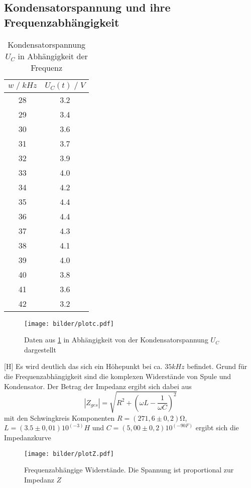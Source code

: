 \subsection{Kondensatorspannung und ihre Frequenzabhängigkeit}
\begin{table}
    \centering
    \begin{tabular}{c c}
        \toprule
        $w\;/\;kHz$ & $U_C(t)\;/\;V$\\
        \midrule
        28      &3.2\\
        29      &3.4\\
        30      &3.6\\
        31      &3.7\\
        32      &3.9\\
        33      &4.0\\
        34      &4.2\\
        35      &4.4\\
        36      &4.4\\
        37      &4.3\\
        38      &4.1\\
        39      &4.0\\
        40      &3.8\\
        41      &3.6\\
        42      &3.2\\
        \bottomrule
    \end{tabular}
    \caption{Kondensatorspannung $U_C$ in Abhängigkeit der Frequenz}
    \label{tab:tabelle_w}
\end{table}
\begin{figure}
    \centering
    \texttt{[image: bilder/plotc.pdf]}
    \caption{
        Daten aus \ref{tab:tabelle_w} in Abhängigkeit von der Kondensatorspannung $U_C$ dargestellt
    }
\end{figure}[H]
Es wird deutlich das sich ein Höhepunkt bei ca. $35kHz$ befindet.
Grund für die Frequenzabhängigkeit sind die komplexen Widerstände von Spule und Kondensator.
Der Betrag der Impedanz ergibt sich dabei aus
\begin{equation}
    |Z_{ges}|=\sqrt{R^2+(\omega L-\frac{1}{\omega C})^2}
\end{equation}
mit den Schwingkreis Komponenten $R=(271,6\pm0,2)\si{\ohm}$, $L=(3.5\pm 0,01)10^(-3)H$ und $C=(5,00\pm 0,2)10^(-90F)$ ergibt 
sich die Impedanzkurve
\begin{figure}[H]
    \centering
    \texttt{[image: bilder/plotZ.pdf]}
    \caption{
        Frequenzabhängige Widerstände. Die Spannung ist proportional zur Impedanz $Z$
    }
\end{figure}
\newpage





